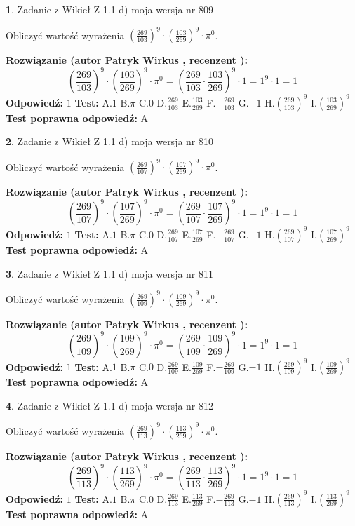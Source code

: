 \documentclass[12pt, a4paper]{article}
\theoremstyle{definition} %
\newtheorem{zad}{}
\newcommand{\zadStart}[1]{\begin{zad}#1\newline}
\newcommand{\zadStop}{\end{zad}}
\newcommand{\rozwStart}[2]{\noindent \textbf{Rozwiązanie (autor #1 , recenzent #2): }\newline}
\newcommand{\rozwStop}{\newline}
\newcommand{\odpStart}{\noindent \textbf{Odpowiedź:}\newline}
\newcommand{\odpStop}{\newline}
\newcommand{\testStart}{\noindent \textbf{Test:}\newline}
\newcommand{\testStop}{\newline}
\newcommand{\kluczStart}{\noindent \textbf{Test poprawna odpowiedź:}\newline}
\newcommand{\kluczStop}{\newline}
\begin{document}
\zadStart{Zadanie z Wikieł Z 1.1 d) moja wersja nr 809}

Obliczyć wartość wyrażenia $(\frac{269}{103})^{9} \cdot (\frac{103}{269})^{9} \cdot \pi^{0}$.
\zadStop
\rozwStart{Patryk Wirkus}{}
$$(\frac{269}{103})^{9} \cdot (\frac{103}{269})^{9} \cdot \pi^{0} = (\frac{269}{103} \cdot \frac{103}{269})^{9} \cdot 1 = 1^{9} \cdot 1 = 1$$
\rozwStop
\odpStart
$1$
\odpStop
\testStart
A.$1$ B.$\pi$ C.$0$ D.$\frac{269}{103}$ E.$\frac{103}{269}$
F.$-\frac{269}{103}$ G.$-1$
H.$(\frac{269}{103})^{9}$
I.$(\frac{103}{269})^{9}$
\testStop
\kluczStart
A
\kluczStop



\zadStart{Zadanie z Wikieł Z 1.1 d) moja wersja nr 810}

Obliczyć wartość wyrażenia $(\frac{269}{107})^{9} \cdot (\frac{107}{269})^{9} \cdot \pi^{0}$.
\zadStop
\rozwStart{Patryk Wirkus}{}
$$(\frac{269}{107})^{9} \cdot (\frac{107}{269})^{9} \cdot \pi^{0} = (\frac{269}{107} \cdot \frac{107}{269})^{9} \cdot 1 = 1^{9} \cdot 1 = 1$$
\rozwStop
\odpStart
$1$
\odpStop
\testStart
A.$1$ B.$\pi$ C.$0$ D.$\frac{269}{107}$ E.$\frac{107}{269}$
F.$-\frac{269}{107}$ G.$-1$
H.$(\frac{269}{107})^{9}$
I.$(\frac{107}{269})^{9}$
\testStop
\kluczStart
A
\kluczStop



\zadStart{Zadanie z Wikieł Z 1.1 d) moja wersja nr 811}

Obliczyć wartość wyrażenia $(\frac{269}{109})^{9} \cdot (\frac{109}{269})^{9} \cdot \pi^{0}$.
\zadStop
\rozwStart{Patryk Wirkus}{}
$$(\frac{269}{109})^{9} \cdot (\frac{109}{269})^{9} \cdot \pi^{0} = (\frac{269}{109} \cdot \frac{109}{269})^{9} \cdot 1 = 1^{9} \cdot 1 = 1$$
\rozwStop
\odpStart
$1$
\odpStop
\testStart
A.$1$ B.$\pi$ C.$0$ D.$\frac{269}{109}$ E.$\frac{109}{269}$
F.$-\frac{269}{109}$ G.$-1$
H.$(\frac{269}{109})^{9}$
I.$(\frac{109}{269})^{9}$
\testStop
\kluczStart
A
\kluczStop



\zadStart{Zadanie z Wikieł Z 1.1 d) moja wersja nr 812}

Obliczyć wartość wyrażenia $(\frac{269}{113})^{9} \cdot (\frac{113}{269})^{9} \cdot \pi^{0}$.
\zadStop
\rozwStart{Patryk Wirkus}{}
$$(\frac{269}{113})^{9} \cdot (\frac{113}{269})^{9} \cdot \pi^{0} = (\frac{269}{113} \cdot \frac{113}{269})^{9} \cdot 1 = 1^{9} \cdot 1 = 1$$
\rozwStop
\odpStart
$1$
\odpStop
\testStart
A.$1$ B.$\pi$ C.$0$ D.$\frac{269}{113}$ E.$\frac{113}{269}$
F.$-\frac{269}{113}$ G.$-1$
H.$(\frac{269}{113})^{9}$
I.$(\frac{113}{269})^{9}$
\testStop
\kluczStart
A
\kluczStop
\end{document}

